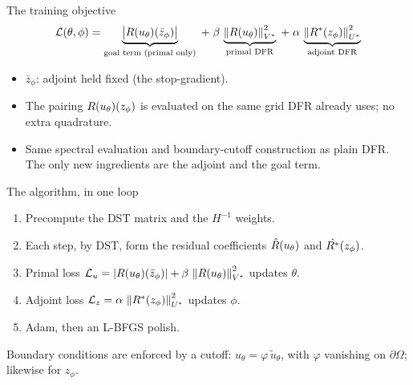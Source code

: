 \documentclass[11pt,aspectratio=169]{beamer}
\begin{document}
\begin{frame}{The training objective}
  \[
    \mathcal{L}(\theta,\phi) =
      \underbrace{\bigl|R(u_\theta)(\bar{z}_\phi)\bigr|}_{\text{goal term (primal only)}}
      \;+\; \beta\,\underbrace{\left\|R(u_\theta)\right\|_{V^*}^2}_{\text{primal DFR}}
      \;+\; \alpha\,\underbrace{\left\|R^{*}(z_\phi)\right\|_{U^*}^2}_{\text{adjoint DFR}}
  \]
  \medskip
  \begin{itemize}\itemsep0.5em
    \item $\bar{z}_\phi$: adjoint held fixed (the stop-gradient).
    \item The pairing $R(u_\theta)(z_\phi)$ is evaluated on the same grid DFR
          already uses; no extra quadrature.
    \item Same spectral evaluation and boundary-cutoff construction as plain DFR.
          The only new ingredients are the adjoint and the goal term.
  \end{itemize}
\end{frame}

\begin{frame}{The algorithm, in one loop}
  \begin{enumerate}\itemsep0.5em
    \item Precompute the DST matrix and the $H^{-1}$ weights.
    \item Each step, by DST, form the residual coefficients $\hat{R}(u_\theta)$
          and $\hat{R^{*}}(z_\phi)$.
    \item Primal loss $\mathcal{L}_u = |R(u_\theta)(\bar{z}_\phi)|
          + \beta\,\left\|R(u_\theta)\right\|_{V^*}^2$ updates $\theta$.
    \item Adjoint loss $\mathcal{L}_z = \alpha\,\left\|R^{*}(z_\phi)\right\|_{U^*}^2$
          updates $\phi$.
    \item Adam, then an L-BFGS polish.
  \end{enumerate}
  \medskip
  Boundary conditions are enforced by a cutoff: $u_\theta = \varphi\,\tilde{u}_\theta$,
  with $\varphi$ vanishing on $\partial\Omega$; likewise for $z_\phi$.
\end{frame}
\end{document}

